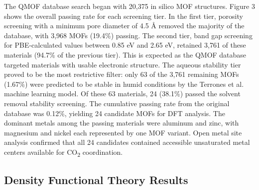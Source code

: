 \documentclass[twoside,twocolumn,9pt]{article}
\begin{document}
The QMOF database search began with 20,375 in silico MOF structures. Figure 3 shows the overall passing rate for each screening tier.
In the first tier, porosity screening with a minimum pore diameter of 4.5 \AA{} removed the majority of the database, with 3,968 MOFs (19.4\%) passing. The second tier, band gap screening for PBE-calculated values between 0.85 eV and 2.65 eV, retained 3,761 of these materials (94.7\% of the previous tier). This is expected as the QMOF database targeted materials with usable electronic structure.
The aqueous stability tier proved to be the most restrictive filter: only 63 of the 3,761 remaining MOFs (1.67\%) were predicted to be stable in humid conditions by the Terrones et al.\cite{terrones_metalorganic_2024} machine learning model. Of these 63 materials, 24 (38.1\%) passed the solvent removal stability screening. The cumulative passing rate from the original database was 0.12\%, yielding 24 candidate MOFs for DFT analysis. The dominant metals among the passing materials were aluminum and zinc, with magnesium and nickel each represented by one MOF variant. Open metal site analysis confirmed that all 24 candidates contained accessible unsaturated metal centers available for CO\textsubscript{2} coordination.

\subsection{Density Functional Theory Results}
\end{document}
